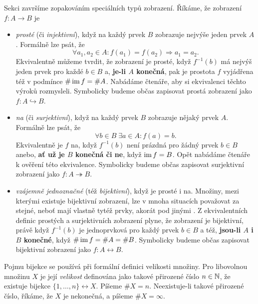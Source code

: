 Sekci završíme zopakováním speciálních typů zobrazení. Říkáme, že zobrazení
$f:A \to B$ je
\begin{itemize}
 \item \emph{prosté} (či \emph{injektivní}), když na každý prvek $B$ zobrazuje
  nejvýše jeden prvek $A$. Formálně lze psát, že
  \[
   \forall a_1,a_2 \in A: f(a_1) = f(a_2) \Rightarrow a_1 = a_2.
  \]
  Ekvivalentně můžeme tvrdit, že zobrazení je prosté, když $f^{-1}(b)$ má
  nejvýš jeden prvek pro každé $b \in B$ a, \textbf{je-li $A$ konečná}, pak je
  prostota $f$ vyjádřena též v podmínce $\# \operatorname{im} f = \# A$. Nabádáme čtenáře,
  aby si ekvivalenci těchto výroků rozmysleli. Symbolicky budeme občas zapisovat
  prostá zobrazení jako $f:A \hookrightarrow B$.
 \item \emph{na} (či \emph{surjektivní}), když na každý prvek $B$ zobrazuje
  nějaký prvek $A$. Formálně lze psát, že
  \[
   \forall b \in B \; \exists a \in A: f(a) = b.
  \]
  Ekvivalentně je $f$ na, když $f^{-1}(b)$ není prázdná pro žádný prvek $b \in
  B$ anebo, \textbf{ať už je $B$ konečná či ne}, když $\operatorname{im} f = B$. Opět
  nabádáme čtenáře k ověření této ekvivalence. Symbolicky budeme občas zapisovat
  surjektivní zobrazení jako $f:A \twoheadrightarrow B$.
 \item \emph{vzájemně jednoznačné} (též \emph{bijektivní}), když je prosté i na.
  Množiny, mezi kterými existuje bijektivní zobrazení, lze v mnoha situacích
  považovat za stejné, neboť mají vlastně tytéž prvky, akorát pod jinými
  . Z ekvivalentních definic prostých a surjektivních zobrazení plyne,
  že zobrazení je bijektivní, právě když $f^{-1}(b)$ je jednoprvková pro každý
  prvek $b \in B$ a též, \textbf{jsou-li $A$ i $B$ konečné}, když $\# \operatorname{im} f =
  \# A = \# B$. Symbolicky budeme občas zapisovat bijektivní zobrazení jako $f:A
  \leftrightarrow B$.
\end{itemize}

Pojmu bijekce se používá při formální definici velikosti množiny. Pro libovolnou
množinu $X$ je její \emph{velikost} definována jako takové přirozené číslo $n
\in \mathbb{N}$, že existuje bijekce $\{1,\ldots,n\} \leftrightarrow X$. Píšeme $\# X =
n$. Neexistuje-li takové přirozené číslo, říkáme, že $X$ je nekonečná, a píšeme
$\# X = \infty$.
